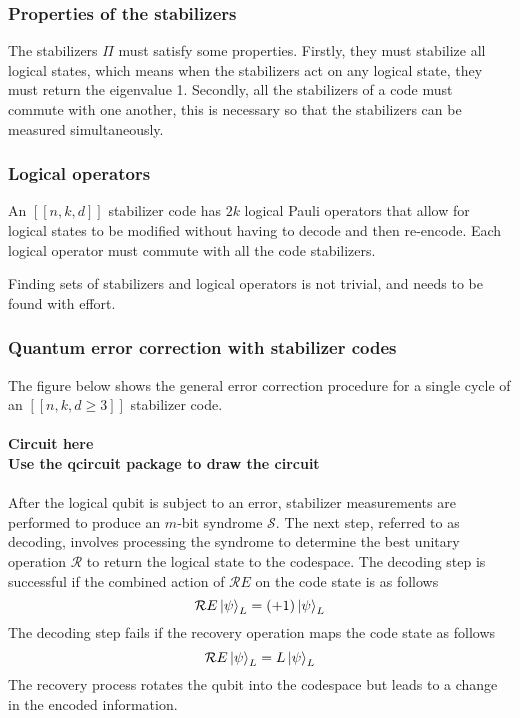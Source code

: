 \subsubsection{Properties of the stabilizers}

The stabilizers $\Pi$ must satisfy some properties. Firstly, they must stabilize all logical states, which means when the stabilizers act on any logical state, they must return the eigenvalue 1. Secondly, all the stabilizers of a code must commute with one another, this is necessary so that the stabilizers can be measured simultaneously.

\subsubsection{Logical operators}

An $[[n,k,d]]$ stabilizer code has $2k$ logical Pauli operators that allow for logical states to be modified without having to decode and then re-encode. Each logical operator must commute with all the code stabilizers.

Finding sets of stabilizers and logical operators is not trivial, and needs to be found with effort.

\subsubsection{Quantum error correction with stabilizer codes}

The figure below shows the general error correction procedure for a single cycle of an $[[n,k,d \geq 3]]$ stabilizer code.
\\
\\
\textbf{Circuit here}
\\
\textbf{Use the qcircuit package to draw the circuit}
\\
\\
After the logical qubit is subject to an error, stabilizer measurements are performed to produce an $m$-bit syndrome $\mathcal{S}$. The next step, referred to as decoding, involves processing the syndrome to determine the best unitary operation $\mathcal{R}$ to return the logical state to the codespace. The decoding step is successful if the combined action of $\mathcal{R}E$ on the code state is as follows
\[
    \mathcal{R}E \ket{\psi}_L = (+1) \ket{\psi}_L
\]
The decoding step fails if the recovery operation maps the code state as follows
\[
    \mathcal{R}E \ket{\psi}_L = L \ket{\psi}_L
\]
The recovery process rotates the qubit into the codespace but leads to a change in the encoded information.
